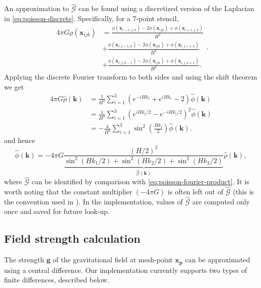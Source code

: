 An approximation to $\hat{\mathcal{G}}$ can be found using a discretized version of the Laplacian in \autoref{eq:poisson-discrete}.
Specifically, for a 7-point stencil,
\begin{equation*}
    \begin{split}
        4\pi G\rho(\mathbf{x}_{ijk})
         & =\frac{\phi(\mathbf{x}_{i-1,j,k}) - 2\phi(\mathbf{x}_{ijk})+\phi(\mathbf{x}_{i+1,j,k})}{H^2}   \\
         & + \frac{\phi(\mathbf{x}_{i,j-1,k}) - 2\phi(\mathbf{x}_{ijk})+\phi(\mathbf{x}_{i,j+1,k})}{H^2}  \\
         & + \frac{\phi(\mathbf{x}_{i,j,k-1}) - 2\phi(\mathbf{x}_{ijk})+\phi(\mathbf{x}_{i,j,k+1})}{H^2}.
    \end{split}.
\end{equation*}
Applying the discrete Fourier transform to both sides and using the shift theorem we get
\begin{align*}
    4\pi G \hat{\rho}(\mathbf{k})
     & = \frac{1}{H^2}\sum_{i=1}^{3}\left( e^{-iHk_i} + e^{iHk_i}-2 \right)\hat{\phi}(\mathbf{k})       \\
     & = \frac{1}{H^2} \sum_{i=1}^{3}\left( e^{iHk_i/2} - e^{-iHk_i/2} \right)^2 \hat{\phi}(\mathbf{k}) \\
     & = -\frac{4}{H^2}\sum_{i=1}^{3}\sin^2\left(\frac{Hk_i}{2}\right)\hat{\phi}(\mathbf{k}).
\end{align*}
and hence
\begin{equation*}
    \hat{\phi}(\mathbf{k}) = -4\pi G\underbrace{\frac{(H/2)^2}{\sin^2(Hk_1/2) + \sin^2(Hk_2/2) + \sin^2 (Hk_3/2)}}_{\hat{\mathcal{G}}(\mathbf{k})} \hat{\rho}(\mathbf{k}),
\end{equation*}
where $\hat{\mathcal{G}}$ can be identified by comparison with \autoref{eq:poisson-fourier-product}.
It is worth noting that the constant multiplier $(-4\pi G)$ is often left out of $\hat{\mathcal{G}}$ (this is the convention used in \cite{Hockney1988}).
In the implementation, values of $\hat{\mathcal{G}}$ are computed only once and saved for future look-up.

\subsection{Field strength calculation}
The strength $\mathbf{g}$ of the gravitational field at mesh-point $\mathbf{x}_\mathbf{p}$ can be approximated using a central difference.
Our implementation currently supports two types of finite differences, described below.

